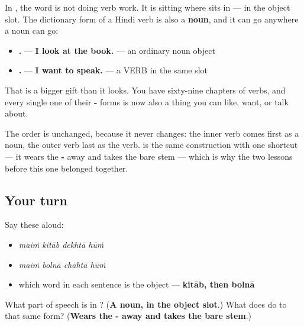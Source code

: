 \begin{grammarlens}[title={Grammar Lens: the -\hi{ना} form is a noun}]
In \textbf{    }, the word \textbf{} is not doing verb work. It is sitting where \textbf{} sits in \textbf{   } — in the object slot. The dictionary form of a Hindi verb is also a \textbf{noun}, and it can go anywhere a noun can go:

\begin{itemize}
\raggedright
  \item \textbf{   .} — \textbf{I look at the book.} — an ordinary noun object
  \item \textbf{   .} — \textbf{I want to speak.} — a VERB in the same slot
\end{itemize}

That is a bigger gift than it looks. You have sixty-nine chapters of verbs, and every single one of their \textbf{-} forms is now also a thing you can like, want, or talk about.

The order is unchanged, because it never changes: the inner verb comes first as a noun, the outer verb last as the verb. \textbf{} is the same construction with one shortcut — it wears the \textbf{-} away and takes the bare stem — which is why the two lessons before this one belonged together.
\end{grammarlens}

\subsection*{Your turn}
Say these aloud:

\begin{itemize}
\raggedright
  \item \emph{maiṁ kitāb dekhtā hūṁ}
  \item \emph{maiṁ bolnā chāhtā hūṁ}
  \item which word in each sentence is the object — \textbf{kitāb, then bolnā}
\end{itemize}

\begin{tcolorbox}[breakable,colback=teal!4,colframe=teal!35!black,title={Before you move on}]
What part of speech is \textbf{} in \textbf{   }? (\textbf{A noun, in the object slot}.) What does \textbf{} do to that same form? (\textbf{Wears the - away and takes the bare stem}.)
\end{tcolorbox}
